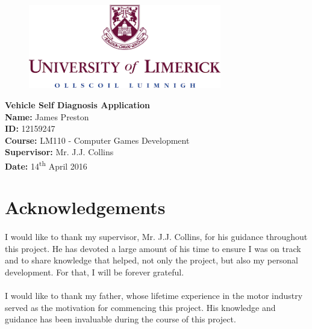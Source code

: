 \documentclass[12pt]{report}
\begin{document}
\begin{titlepage}
	\begin{center}		
		\vspace*{1cm}
		\begin{figure}[h]
			\includegraphics[width=0.75\textwidth , center]{UL.png}
		\end{figure}
		\vspace*{5cm}
		\textbf{\LARGE{Vehicle Self Diagnosis Application}}\\
		\vspace{5cm}
		\large{		
		\textbf{Name:} James Preston\\
		\textbf{ID:} 12159247\\
		\textbf{Course:} LM110 - Computer Games Development\\
		\textbf{Supervisor:} Mr. J.J. Collins\\
		\textbf{Date:} 14\textsuperscript{th} April 2016 \\
		}
	\end{center}
\end{titlepage}


	\section*{Acknowledgements}
		\paragraph{}{
		I would like to thank my supervisor, Mr. J.J. Collins, for his guidance throughout this project. He has devoted a large amount of his time to ensure I was on track and to share knowledge that helped, not only the project, but also my personal development. For that, I will be forever grateful.
		}
		\paragraph{}{
		I would like to thank my father, whose lifetime experience in the motor industry served as the motivation for commencing this project. His knowledge and guidance has been invaluable during the course of this project.
		}
		
\end{document}
